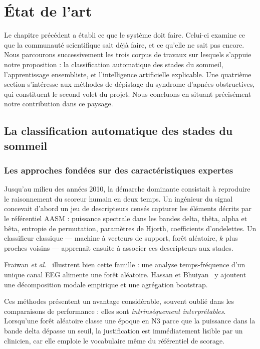 \chapter{État de l'art}
\label{chap:etat-art}

Le chapitre précédent a établi ce que le système doit faire. Celui-ci examine ce que
la communauté scientifique sait déjà faire, et ce qu'elle ne sait pas encore. Nous
parcourons successivement les trois corpus de travaux sur lesquels s'appuie notre
proposition : la classification automatique des stades du sommeil, l'apprentissage
ensembliste, et l'intelligence artificielle explicable. Une quatrième section
s'intéresse aux méthodes de dépistage du syndrome d'apnées obstructives, qui
constituent le second volet du projet. Nous concluons en situant précisément notre
contribution dans ce paysage.

\section{La classification automatique des stades du sommeil}

\subsection{Les approches fondées sur des caractéristiques expertes}

Jusqu'au milieu des années 2010, la démarche dominante consistait à reproduire le
raisonnement du scoreur humain en deux temps. Un ingénieur du signal concevait
d'abord un jeu de descripteurs censés capturer les éléments décrits par le référentiel
AASM : puissance spectrale dans les bandes delta, thêta, alpha et bêta, entropie de
permutation, paramètres de Hjorth, coefficients d'ondelettes. Un classifieur classique
— machine à vecteurs de support, forêt aléatoire, $k$ plus proches voisins — apprenait
ensuite à associer ces descripteurs aux stades.

Fraiwan \emph{et al.}~\cite{fraiwan2012} illustrent bien cette famille : une analyse
temps-fréquence d'un unique canal EEG alimente une forêt aléatoire. Hassan et
Bhuiyan~\cite{hassan2016} y ajoutent une décomposition modale empirique et une
agrégation bootstrap.

Ces méthodes présentent un avantage considérable, souvent oublié dans les comparaisons
de performance : elles sont \emph{intrinsèquement interprétables}. Lorsqu'une forêt
aléatoire classe une époque en N3 parce que la puissance dans la bande delta dépasse
un seuil, la justification est immédiatement lisible par un clinicien, car elle emploie
le vocabulaire même du référentiel de scorage.

